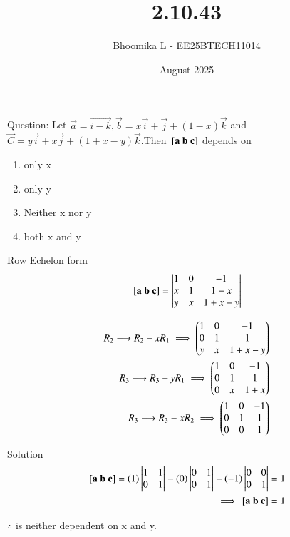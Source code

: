 \documentclass{beamer}
\title %
{2.10.43}
\date{August  2025}
\author %
{Bhoomika L - EE25BTECH11014}
\begin{document}
\frame{\titlepage}
\begin{frame}{Question:}
 Let $\vec{a} = \vec{i - k}, \vec{b} = x\vec{i} + \vec{j} + (1 - x) \vec{k}$ and $\vec{C} = y\vec{i} + x\vec{j} + (1 + x - y)\vec{k}.$Then ${}\left[\mathbf{a}\  \mathbf{b}\ \mathbf{c}\right]$ depends on
\begin{multicols}{}
\begin{enumerate}
\item only x
\item only y
\item Neither x nor y
\item both x and y
\end{enumerate}
\end{multicols}
\end{frame}

\begin{frame}{Row Echelon form}
\begin{align}
\sbrak{\vec{a}\ \vec{b}\ \vec{c}}=\left|\begin{matrix}1&0&-1\\x&1&1-x\\y&x&1+x-y\end{matrix}\right|
 \end{align}
 
\begin{align}
      R_{2} \longrightarrow R_{2}-xR_{1}  \implies \begin{pmatrix}1 & 0 &-1\\0 & 1 & 1\\y & x & 1+x-y\end{pmatrix}\\
    R_{3} \longrightarrow R_{3}-yR_{1}\implies \begin{pmatrix}1 & 0 &-1\\0 & 1 & 1\\0 & x & 1+x\end{pmatrix}\\
      R_{3} \longrightarrow R_{3}-xR_{2} \implies \begin{pmatrix}1 & 0 &-1\\0 & 1 & 1\\0 & 0 & 1\end{pmatrix}
\end{align}
\end{frame}

\begin{frame}{Solution}
\begin{align}
    \sbrak{\Vec{a} \ \Vec{b} \ \Vec{c}}= \brak{1}\left|\begin{matrix}1&1\\0&1\end{matrix}\right|-\brak{0}\left|\begin{matrix}0&1\\0&1\end{matrix}\right|+\brak{-1}\left|\begin{matrix}0&0\\0&1\end{matrix}\right|=1\\
\implies \sbrak{\Vec{a} \ \Vec{b} \ \Vec{c}}= 1
\end{align}
\begin{center}
    $\therefore$  is neither dependent on x and y.
\end{center}    
\end{frame}
\end{document}
